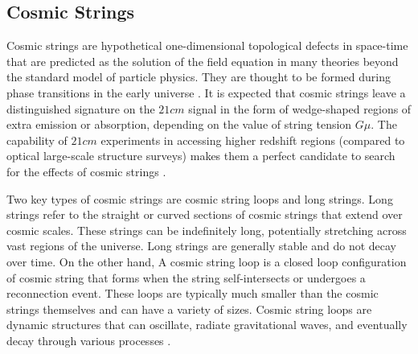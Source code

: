 \documentclass[12pt, TexShade, letterpaper]{report}
\begin{document}
\subsection{Cosmic Strings}
 Cosmic strings are hypothetical one-dimensional topological defects in space-time that are predicted as the solution of the field equation in many theories beyond the standard model of particle physics. They are thought to be formed during phase transitions in the early universe \cite{bryce_thesis, constrain_superconduct}.
 It is expected that cosmic strings leave a distinguished signature on the $21cm$ signal in the form of wedge-shaped regions of extra emission or absorption, depending on the value of string tension $G\mu$. The capability of $21cm$ experiments in accessing higher redshift regions (compared to optical large-scale structure surveys) makes them a perfect candidate to search for the effects of cosmic strings  \cite{cosmic_string_brandenberger, structure_cosmic_string}.\par
Two key types of cosmic strings are cosmic string loops and long strings. Long strings refer to the straight or curved sections of cosmic strings that extend over cosmic scales. These strings can be indefinitely long, potentially stretching across vast regions of the universe. Long strings are generally stable and do not decay over time. On the other hand, A cosmic string loop is a closed loop configuration of cosmic string that forms when the string self-intersects or undergoes a reconnection event. These loops are typically much smaller than the cosmic strings themselves and can have a variety of sizes. Cosmic string loops are dynamic structures that can oscillate, radiate gravitational waves, and eventually decay through various processes \cite{cosmic_strings_book}.  \par
\end{document}
